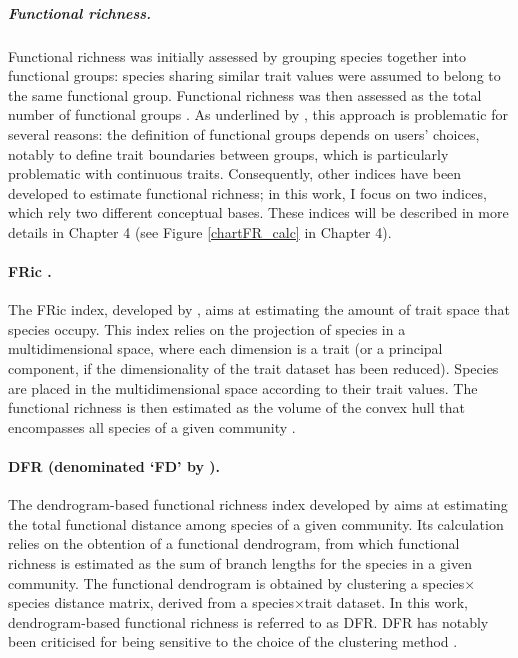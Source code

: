 \subparagraph{Functional richness.} 
Functional richness was initially assessed by grouping species together into functional groups: species sharing similar trait values were assumed to belong to the same functional group. Functional richness was then assessed as the total number of functional groups \citep{Legras2018}. As underlined by \citet{Legras2018}, this approach is problematic for several reasons: the definition of functional groups depends on users’ choices, notably to define trait boundaries between groups, which is particularly problematic with continuous traits. Consequently, other indices have been developed to estimate functional richness; in this work, I focus on two indices, which rely two different conceptual bases. These indices will be described in more details in Chapter 4 (see Figure \ref{chartFR_calc} in Chapter 4).

\paragraph{FRic \citep{Villeger2008}.}
The FRic index, developed by \citet{Villeger2008}, aims at estimating the amount of trait space that species occupy. This index relies on the projection of species in a multidimensional space, where each dimension is a trait (or a principal component, if the dimensionality of the trait dataset has been reduced). Species are placed in the multidimensional space according to their trait values. The functional richness is then estimated as the volume of the convex hull that encompasses all species of a given community \citep{Villeger2008}.
  
\paragraph{DFR (denominated `FD' by \citet{Petchey2002}).}
The dendrogram-based functional richness index developed by \citet{Petchey2002} aims at estimating the total functional distance among species of a given community. Its calculation relies on the obtention of a functional dendrogram, from which functional richness is estimated as the sum of branch lengths for the species in a given community. The functional dendrogram is obtained by clustering a species$\times$species distance matrix, derived from a species$\times$trait dataset. In this work, dendrogram-based functional richness is referred to as DFR. DFR has notably been criticised for being sensitive to the choice of the clustering method \citep{Legras2018}.
 
